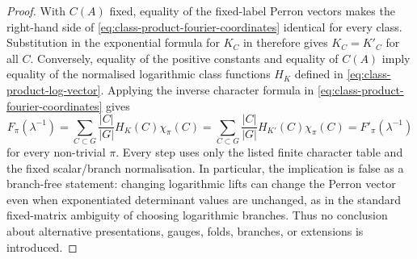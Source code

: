 \documentclass[11pt,a4paper]{amsart}
\theoremstyle{plain}
\theoremstyle{definition}
\theoremstyle{remark}
\begin{document}
\begin{proof}
  With \(C(A)\) fixed, equality of the fixed-label Perron vectors makes the
  right-hand side of \eqref{eq:class-product-fourier-coordinates} identical for
  every class.  Substitution in the exponential formula for \(K_C\) in
   therefore gives
  \(K_C=K'_C\) for all \(C\).  Conversely, equality of the positive constants
  and equality of \(C(A)\) imply equality of the normalised logarithmic class
  functions \(H_K\) defined in \eqref{eq:class-product-log-vector}.  Applying
  the inverse character formula in
  \eqref{eq:class-product-fourier-coordinates} gives
  \[
    F_\pi(\lambda^{-1})
    =\sum_{C\subset G}\frac{|C|}{|G|}H_K(C)\chi_\pi(C)
    =\sum_{C\subset G}\frac{|C|}{|G|}H_{K'}(C)\chi_\pi(C)
    =F'_\pi(\lambda^{-1})
  \]
  for every non-trivial \(\pi\).  Every step uses only the listed finite
  character table and the fixed scalar/branch normalisation.  In particular,
  the implication is false as a branch-free statement: changing logarithmic
  lifts can change the Perron vector even when exponentiated determinant
  values are unchanged, as in the standard fixed-matrix ambiguity of choosing logarithmic branches.
  Thus no conclusion
  about alternative presentations, gauges, folds, branches, or extensions is
  introduced.
\end{proof}
\end{document}
